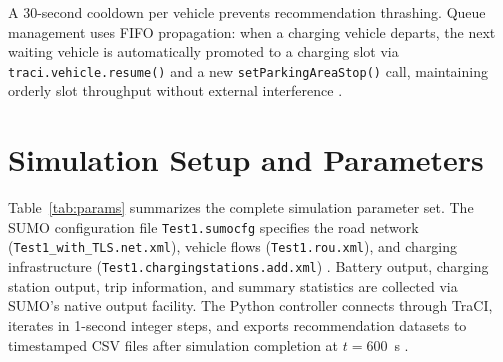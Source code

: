 \documentclass[conference]{IEEEtran}
\begin{document}
A 30-second cooldown per vehicle prevents recommendation thrashing. Queue management uses FIFO propagation: when a charging vehicle departs, the next waiting vehicle is automatically promoted to a charging slot via \texttt{traci.vehicle.resume()} and a new \texttt{setParkingAreaStop()} call, maintaining orderly slot throughput without external interference \cite{b11}.

\section{Simulation Setup and Parameters}

Table~\ref{tab:params} summarizes the complete simulation parameter set. The SUMO configuration file \texttt{Test1.sumocfg} specifies the road network (\texttt{Test1\_with\_TLS.net.xml}), vehicle flows (\texttt{Test1.rou.xml}), and charging infrastructure (\texttt{Test1.chargingstations.add.xml}) \cite{b10}. Battery output, charging station output, trip information, and summary statistics are collected via SUMO's native output facility. The Python controller connects through TraCI, iterates in 1-second integer steps, and exports recommendation datasets to timestamped CSV files after simulation completion at $t = 600$~s \cite{b11}.
\end{document}
